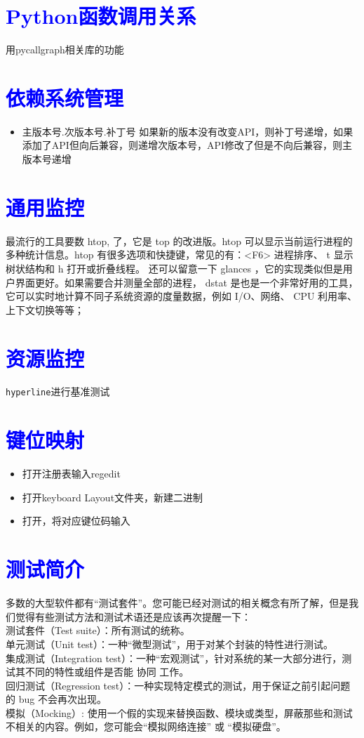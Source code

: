 \documentclass{article}
\begin{document}
\section{\textcolor{blue}{Python函数调用关系}}
用pycallgraph相关库的功能
\section{\textcolor{blue}{依赖系统管理}}
    \begin{itemize}
        \item 主版本号.次版本号.补丁号 如果新的版本没有改变API，则补丁号递增，如果添加了API但向后兼容，则递增次版本号，API修改了但是不向后兼容，则主版本号递增 
    \end{itemize}
\section{\textcolor{blue}{通用监控}}
最流行的工具要数 htop, 了，它是 top 的改进版。htop 可以显示当前运行进程的多种统计信息。htop 有很多选项和快捷键，常见的有：<F6> 进程排序、 t 显示树状结构和 h 打开或折叠线程。 还可以留意一下 glances ，它的实现类似但是用户界面更好。如果需要合并测量全部的进程， dstat 是也是一个非常好用的工具，它可以实时地计算不同子系统资源的度量数据，例如 I/O、网络、 CPU 利用率、上下文切换等等；
\section{\textcolor{blue}{资源监控}}
\texttt{hyperline}进行基准测试    
\section{\textcolor{blue}{键位映射}}
\begin{itemize}
    \item 打开注册表输入regedit
    \item 打开keyboard Layout文件夹，新建二进制
    \item 打开，将对应键位码输入
\end{itemize}
\section{\textcolor{blue}{测试简介}}
多数的大型软件都有“测试套件”。您可能已经对测试的相关概念有所了解，但是我们觉得有些测试方法和测试术语还是应该再次提醒一下：\\
测试套件（Test suite）：所有测试的统称。\\
单元测试（Unit test）：一种“微型测试”，用于对某个封装的特性进行测试。\\
集成测试（Integration test）：一种“宏观测试”，针对系统的某一大部分进行，测试其不同的特性或组件是否能 协同 工作。\\
回归测试（Regression test）：一种实现特定模式的测试，用于保证之前引起问题的 bug 不会再次出现。\\
模拟（Mocking）: 使用一个假的实现来替换函数、模块或类型，屏蔽那些和测试不相关的内容。例如，您可能会“模拟网络连接” 或 “模拟硬盘”。\\
\end{document}
